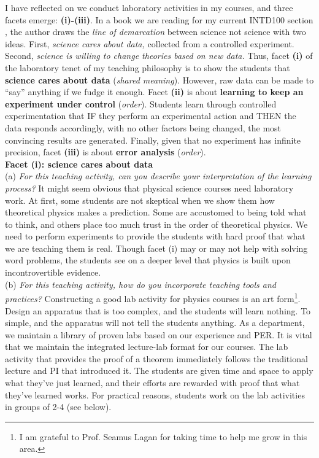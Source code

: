 \documentclass[../../../main.tex]{subfiles}
\begin{document}
I have reflected on we conduct laboratory activities in my courses, and three facets emerge: \textbf{(i)-(iii)}.  In a book we are reading for my current INTD100 section \cite{scientific_attitude}, the author draws the \textit{line of demarcation} between science not science with two ideas.  First, \textit{science cares about data,} collected from a controlled experiment.  Second, \textit{science is willing to change theories based on new data.}  Thus, facet \textbf{(i)} of the laboratory tenet of my teaching philosophy is to show the students that \textbf{science cares about data} (\textit{shared meaning}).  However, raw data can be made to ``say'' anything if we fudge it enough.  Facet \textbf{(ii)} is about \textbf{learning to keep an experiment under control} (\textit{order}).  Students learn through controlled experimentation that IF they perform an experimental action and THEN the data responds accordingly, with no other factors being changed, the most convincing results are generated.  Finally, given that no experiment has infinite precision, facet \textbf{(iii)} is about \textbf{error analysis} (\textit{order}).
\\
\vspace{0.25cm}
\textbf{Facet (i): science cares about data}
\\
\vspace{0.25cm}
(a) \textit{For this teaching activity, can you describe your interpretation of the learning process?}  It might seem obvious that physical science courses need laboratory work.  At first, some students are not skeptical when we show them how theoretical physics makes a prediction.  Some are accustomed to being told what to think, and others place too much trust in the order of theoretical physics.  We need to perform experiments to provide the students with hard proof that what we are teaching them is real.  Though facet (i) may or may not help with solving word problems, the students see on a deeper level that physics is built upon incontrovertible evidence.
\\
\vspace{0.25cm}
(b) \textit{For this teaching activity, how do you incorporate teaching tools and practices?}  Constructing a good lab activity for physics courses is an art form\footnote{I am grateful to Prof. Seamus Lagan for taking time to help me grow in this area.}.  Design an apparatus that is too complex, and the students will learn nothing.  To simple, and the apparatus will not tell the students anything.  As a department, we maintain a library of proven labs based on our experience and PER.  It is vital that we maintain the integrated lecture-lab format for our courses.  The lab activity that provides the proof of a theorem immediately follows the traditional lecture and PI that introduced it.  The students are given time and space to apply what they've just learned, and their efforts are rewarded with proof that what they've learned works.  For practical reasons, students work on the lab activities in groups of 2-4 (see below).
\end{document}
